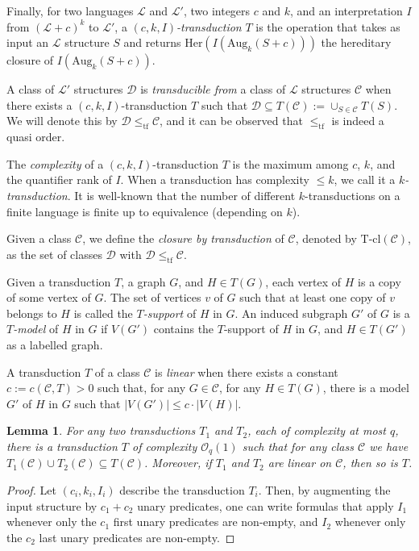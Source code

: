 \documentclass[11pt]{article}
\newtheorem{lemma}[theorem]{Lemma}
\theoremstyle{definition}
\newcommand{\CC}{{\mathscr C}}
\newcommand{\DD}{{\mathscr D}}
\newcommand{\Oh}{\mathcal{O}}
\renewcommand{\le}{\leqslant}
\newcommand{\Ll}{\mathcal L}
\newcommand{\remph}[1]{{\color{red} \emph{#1}}}
\newcommand{\Aug}{\text{Aug}}
\newcommand{\tf}{\leqslant_{\text{tf}}}
\newcommand{\Tcl}{\text{T-cl}}
\begin{document}
Finally, for two languages $\Ll$ and $\Ll'$, two integers $c$ and $k$, and an interpretation $I$ from $(\Ll + c)^k$ to $\Ll'$, a \remph{$(c, k, I)$-transduction} $T$ is the operation that takes as input an $\Ll$ structure $S$ and returns $\text{Her}(I(\Aug_k(S + c)))$ the hereditary closure of $I(\Aug_k(S + c))$.

A class of $\Ll'$ structures $\DD$ is \remph{transducible from} a class of $\Ll$ structures $\CC$ when there exists a $(c, k, I)$-transduction $T$ such that $\DD \subseteq  T(\CC) := \cup_{S \in \CC} T(S)$.
We will denote this by $\DD \tf \CC$, and it can be observed that $\tf$ is indeed a quasi order.

The \remph{complexity} of a $(c, k, I)$-transduction $T$ is the maximum among $c$, $k$, and the quantifier rank of $I$.
When a transduction has complexity $\le k$, we call it a \remph{$k$-transduction}.
It is well-known that the number of different $k$-transductions on a finite language is finite up to equivalence (depending on $k$).


Given a class $\CC$, we define the \remph{closure by transduction} of $\CC$, denoted by $\Tcl(\CC)$, as the set of classes $\DD$ with $\DD \tf \CC$.

Given a transduction $T$, a graph $G$, and $H \in T(G)$, each vertex of $H$ is a copy of some vertex of $G$.
The set of vertices $v$ of $G$ such that at least one copy of $v$ belongs to $H$ is called the \remph{$T$-support} of $H$ in $G$.
An induced subgraph $G'$ of $G$ is a \remph{$T$-model} of $H$ in $G$ if $V(G')$ contains the $T$-support of $H$ in $G$, and $H \in T(G')$ as a labelled graph.

A transduction $T$ of a class $\CC$ is \remph{linear} when there exists a constant $c := c(\CC, T) > 0$ such that, for any $G \in \CC$, for any $H \in T(G)$, there is a model $G'$ of $H$ in $G$ such that $|V(G')| \le c \cdot |V(H)|$.

\begin{lemma}\label{lem:transunion}
For any two transductions $T_1$ and $T_2$, each of complexity at most $q$, there is a transduction $T$ of complexity $\Oh_q(1)$ such that for any class $\CC$ we have $T_1(\CC) \cup T_2(\CC) \subseteq T(\CC)$.
Moreover, if $T_1$ and $T_2$ are linear on $\CC$, then so is $T$.
\end{lemma}
\begin{proof}
Let $(c_i, k_i, I_i)$ describe the transduction $T_i$.
Then, by augmenting the input structure by $c_1 + c_2$ unary predicates, one can write formulas that apply $I_1$ whenever only the $c_1$ first unary predicates are non-empty, and $I_2$ whenever only the $c_2$ last unary predicates are non-empty.
\end{proof}
\end{document}
